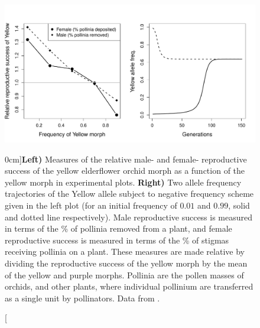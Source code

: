 \begin{figure}
\begin{center}
  \includegraphics[width = \textwidth]{Journal_figs/single_locus_selection/Elderflower_orchid/Elderflower_orchids_fitness.pdf}
\end{center}
\caption[][0cm]{{\bf Left)} Measures of the relative male- and female- reproductive success of the yellow elderflower orchid morph
  as a function of the yellow morph in experimental plots. {\bf
    Right)} Two allele frequency trajectories of the Yellow allele
  subject to negative frequency scheme given in the left plot
  (for an initial frequency of $0.01$ and $0.99$, solid and dotted
  line respectively). 
  Male
  reproductive success is measured in terms of the \% of pollinia
  removed from a plant, and female reproductive success is measured in terms of the
  \% of stigmas receiving pollinia on a plant. These measures are made
relative by dividing the reproductive success of the yellow morph by the
mean of the yellow and purple morphs. Pollinia are the pollen masses of
orchids, and other plants, where individual pollinium are transferred
as a single unit by pollinators. Data from
\citet{gigord2001negative}. } \label{fig:Elderflower_orchids_fitness}  
\end{figure}


